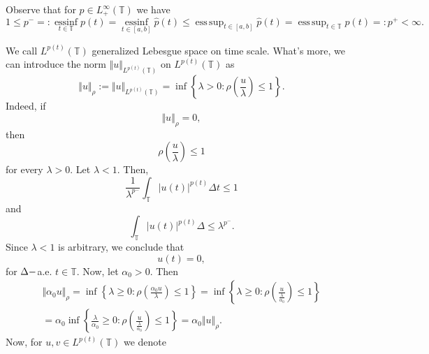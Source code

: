 \documentclass[12pt,a4paper,oneside,titlepage]{article}
\DeclareMathOperator*{\esssup}{ess\,sup}
\newcommand{\essinf}{\operatorname{essinf}\limits}
\begin{document}
\bigskip
Observe that for $p \in L^{\infty}_{+}(\mathbb{T})$ we have
\begin{equation}
\label{p_plus_minus}
1 \leq p^{-}=: \essinf_{t \in \mathbb{T}}p(t)= \essinf_{t \in [a,b]}\widehat{p}(t) \leq \esssup_{t \in [a,b]}\widehat{p}(t) = \esssup_{t \in \mathbb{T}}p(t)=: p^{+}< \infty.
\end{equation}

We call $L^{p(t)}(\mathbb{T})$ generalized Lebesgue space on time scale. What's more, we can introduce the norm $\Vert u \Vert_{L^{p(t)}(\mathbb{T})}$ on $L^{p(t)}(\mathbb{T})$ as
\begin{equation}
\Vert u \Vert_{\rho} :=\Vert u \Vert_{L^{p(t)}(\mathbb{T})} = \inf \left\lbrace \lambda > 0 : \rho\left(\frac{u}{\lambda}\right) \leq 1 \right\rbrace. 
\end{equation}
Indeed, if
\begin{equation}
\nonumber
\Vert u \Vert_{\rho} = 0,
\end{equation}
then
\begin{equation}
\nonumber
\rho \left( \frac{u}{\lambda} \right) \leq 1 
\end{equation}
for every $\lambda >0$. Let $\lambda <1$. Then,
\begin{equation}
\nonumber
\frac{1}{\lambda^{p^-}} \int_{\mathbb{T}} \vert u(t) \vert^{p(t)} \Delta t \leq 1
\end{equation}
and
\begin{equation}
\nonumber
\int_{\mathbb{T}} \vert u(t) \vert^{p(t)} \Delta \leq \lambda^{p^-}. 
\end{equation}
Since $\lambda <1$ is arbitrary, we conclude that
\begin{equation}
\nonumber
u(t) = 0,
\end{equation}
for $\Delta \-- $a.e. $t \in \mathbb{T}$.
Now, let $\alpha_0>0$. Then
\begin{equation}
\begin{split}
\Vert \alpha_0 u \Vert_{\rho} = \inf \left\lbrace \lambda \geq 0 : \rho \left( \frac{\alpha_0 u }{\lambda} \right) \leq 1 \right\rbrace = \inf \left\lbrace \lambda \geq 0 : \rho \left( \frac{u}{\frac{\lambda}{\alpha_0}} \right) \leq  1 \right\rbrace \\  =  \alpha_0 \inf \left\lbrace \frac{\lambda}{\alpha_0 } \geq 0 : \rho \left( \frac{u}{\frac{\lambda}{\alpha_0}} \right) \leq 1 \right\rbrace = \alpha_0 \Vert u \Vert_{\rho}.
\end{split}
\end{equation}
Now, for $u,v \in L^{p(t)}(\mathbb{T})$ we denote
\end{document}
